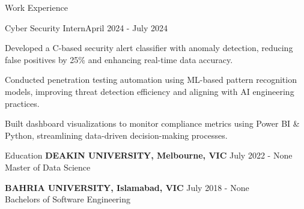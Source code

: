 \documentclass{resume} %
\begin{document}
    \begin{rSection}{Work Experience}
                    \begin{rSubsection}
                {Cyber Security Intern}{April 2024 - July 2024}
                                    {}
                                {}
                                    \item Developed a C{-}based security alert classifier with anomaly detection, reducing false positives by 25\% and enhancing real{-}time data accuracy.
                                    \item Conducted penetration testing automation using ML{-}based pattern recognition models, improving threat detection efficiency and aligning with AI engineering practices.
                                    \item Built dashboard visualizations to monitor compliance metrics using Power BI \& Python, streamlining data{-}driven decision{-}making processes.
                            \end{rSubsection}
            \end{rSection}

\begin{rSection}{Education}
                        \textbf{DEAKIN UNIVERSITY, Melbourne, VIC} \hfill {July 2022 - None} \\
                            {Master of Data Science}
                         
             
         
                        \textbf{BAHRIA UNIVERSITY, Islamabad, VIC} \hfill {July 2018 - None} \\
                            {Bachelors of Software Engineering}
                         
             
         
    \end{rSection}
\end{document}
